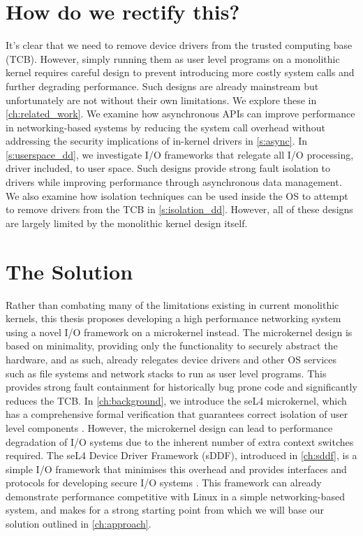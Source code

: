 \section{How do we rectify this?}
It's clear that we need to remove device drivers from the trusted computing base (TCB). However, simply 
running them as user level programs on a monolithic kernel requires careful design to prevent introducing
more costly system calls and further degrading performance. Such designs are already mainstream but unfortunately
are not without their own limitations. We explore these in \autoref{ch:related_work}. We examine how
asynchronous APIs can improve
performance in networking-based systems by reducing the system call overhead without addressing the security
implications of in-kernel drivers in \autoref{s:async}. In \autoref{s:userspace_dd}, we investigate I/O frameworks
that relegate all I/O processing, driver included, to user space. Such designs provide strong fault isolation to
drivers while improving performance through asynchronous data management. 
We also examine how isolation techniques can be used inside the OS to attempt to remove
drivers from the TCB in \autoref{s:isolation_dd}.
However, all of these designs are largely limited by the monolithic kernel design itself.

\section{The Solution}
Rather than combating many of the limitations existing in current monolithic kernels,
this thesis proposes developing a high performance networking system using a novel I/O framework on
a microkernel instead. The microkernel design is based on minimality, providing only the functionality to
securely abstract the hardware, and as such, already relegates device drivers and
other OS services such as file systems and network stacks to run as user level programs. This provides
strong fault containment for historically bug prone code and significantly reduces the TCB.
In \autoref{ch:background}, we introduce the seL4 microkernel, which has a comprehensive formal verification
that guarantees correct isolation of user level components \cite{Klein_AEMSKH_14}.
However, the microkernel design can lead to performance
degradation of I/O systems due to the inherent number of extra context switches required. The seL4 Device Driver
Framework (sDDF), introduced in \autoref{ch:sddf}, is a simple I/O framework that minimises this overhead
and provides interfaces and protocols for developing secure I/O systems \cite{Parker_22:sddf}. This 
framework can already demonstrate performance competitive with Linux in a simple networking-based
system, and makes for a strong starting point from which we will base our
solution outlined in \autoref{ch:approach}.
